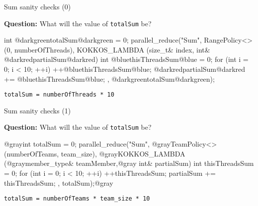 
\ifmedium
\begin{frame}[fragile]{Sum sanity checks (0)}

  \textbf{Question:} What will the value of \texttt{totalSum} be?

  \begin{code}[linebackgroundcolor={}]
int @darkgreentotalSum@darkgreen = 0;
parallel_reduce("Sum", RangePolicy<>(0, numberOfThreads),
  KOKKOS_LAMBDA (size_t& index, int& @darkredpartialSum@darkred) {
    int @bluethisThreadsSum@blue = 0;
    for (int i = 0; i < 10; ++i) {
      ++@bluethisThreadsSum@blue;
    }
    @darkredpartialSum@darkred += @bluethisThreadsSum@blue;
}, @darkgreentotalSum@darkgreen);
  \end{code}

  \pause

  \vspace{15pt}

  \texttt{totalSum = numberOfThreads * 10}

\end{frame}
\fi


\ifmedium
\begin{frame}[fragile]{Sum sanity checks (1)}

  \textbf{Question:} What will the value of \texttt{totalSum} be?

  \begin{code}[linebackgroundcolor={}]
@grayint totalSum = 0;
parallel_reduce("Sum", @grayTeamPolicy<>(numberOfTeams, team_size),
  @grayKOKKOS_LAMBDA (@graymember_type& teamMember,@gray int& partialSum) {
    int thisThreadsSum = 0;
    for (int i = 0; i < 10; ++i) {
      ++thisThreadsSum;
    }
    partialSum += thisThreadsSum;
}, totalSum);@gray
  \end{code}

  \pause

  \vspace{15pt}

  \texttt{totalSum = numberOfTeams * team\_size * 10}

\end{frame}
\fi


